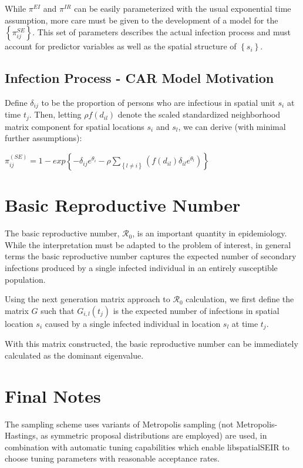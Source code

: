 \documentclass[12pt]{article}
\begin{document}
        While $\pi^{EI}$ and $\pi^{IR}$ can be easily parameterized with the usual exponential time assumption, more care must be given to the development 
        of a model for the $\left\{\pi^{SE}_{ij} \right\}$. This set of parameters 
        describes the actual infection process and must account for predictor variables as well as the 
        spatial structure of $\left\{ s_i \right\}$. 

\subsection{Infection Process - CAR Model Motivation}

Define $\delta_{ij}$ to be the proportion of persons who are infectious in spatial unit $s_i$ 
at time $t_j$. Then, letting $\rho f(d_{il})$ denote the scaled standardized neighborhood matrix component for spatial 
locations $s_i$ and $s_l$, we can derive (with minimal further assumptions):

\begin{center}
    $\displaystyle \pi^{(SE)}_{ij} = 1- exp\left\{-\delta_{ij}e^{\theta_{i}} - \rho \sum_{\left\{ l \ne i  \right\}}
        (f(d_{il})\delta_{il}e^{\theta_{l}})   \right\}$ 
\end{center}
 
\section{Basic Reproductive Number}
The basic reproductive number, $\mathcal{R}_0$, is an important quantity in epidemiology. While the interpretation must be adapted to 
the problem of interest, in general terms the basic reproductive number captures the expected number of secondary 
infections produced by a single infected individual in an entirely susceptible population. 

Using the next generation matrix approach to $\mathcal{R}_0$ calculation, we first define the matrix $G$ such 
that $G_{i,l}(t_j)$ is the expected number of infections in spatial location $s_i$ caused by a single infected
individual in location $s_l$ at time $t_j$.

With this matrix constructed, the basic reproductive number can be immediately calculated as the dominant eigenvalue. 


\section{Final Notes}

The sampling scheme uses variants of Metropolis sampling (not Metropolis-Hastings, as symmetric proposal distributions are employed) 
are used, in combination with automatic tuning capabilities which enable libspatialSEIR to choose tuning parameters with reasonable acceptance rates. 
\end{document}
